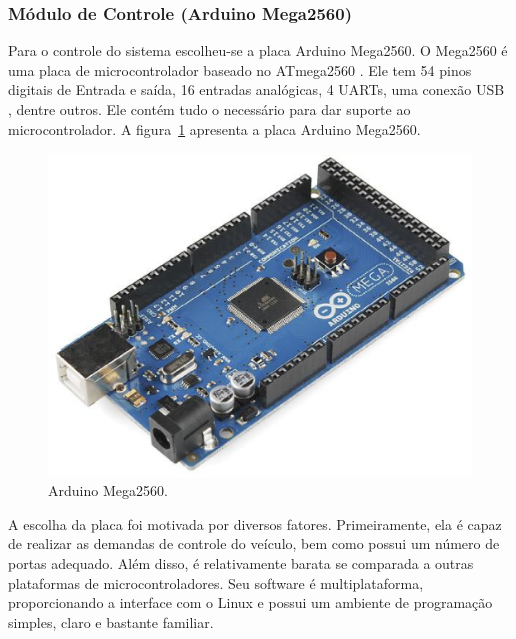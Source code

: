   \subsubsection{Módulo de Controle (Arduino Mega2560)}

  Para o controle do sistema escolheu-se a placa Arduino Mega2560.
  O Mega2560 é uma placa de microcontrolador baseado no ATmega2560 .
  Ele tem 54 pinos digitais de Entrada e saída, 16 entradas analógicas,
  4 UARTs, uma conexão USB , dentre outros. Ele contém tudo o necessário
  para dar suporte ao microcontrolador. A figura~\ref{fig:arduino} apresenta a placa
  Arduino Mega2560.

  \begin{figure}[!htbp]
  \begin{center}
  \includegraphics[width=.6\textwidth]{figuras/arduino.eps}
  \caption{\label{fig:arduino}Arduino Mega2560.}
  \end{center}
  \end{figure}

  A escolha da placa foi motivada por diversos fatores.
  Primeiramente, ela é capaz de realizar as demandas de controle do
  veículo, bem como possui um número de portas adequado. Além disso,
  é relativamente barata se comparada a outras plataformas de
  microcontroladores. Seu software é multiplataforma, proporcionando
  a interface com o Linux e possui um ambiente de programação simples,
  claro e bastante familiar.

